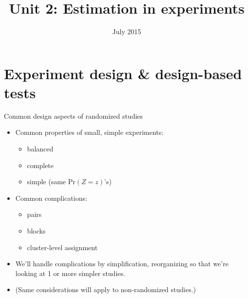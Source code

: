 




%

%




\title{Unit 2: Estimation in experiments}
\date{July 2015}



\section{Experiment design \& design-based tests} %


\begin{frame}{Common design aspects of randomized studies} 
  \begin{itemize}
  \item<1-> Common properties of small, simple experiments:
    \begin{itemize}
    \item balanced 
    \item complete
    \item simple (same $\mathrm{Pr}(Z=z)$'s)
    \end{itemize}
  \item<2-> Common complications:
    \begin{itemize}
    \item<2-> pairs
    \item<2-> blocks
    \item<2-> cluster-level assignment
    \end{itemize}
  \item<3-> We'll handle complications by simplification, reorganizing so that we're looking at 1 or more simpler studies.
  \item<4-> (Same considerations will apply to non-randomized studies.)
  \end{itemize}

\end{frame}


